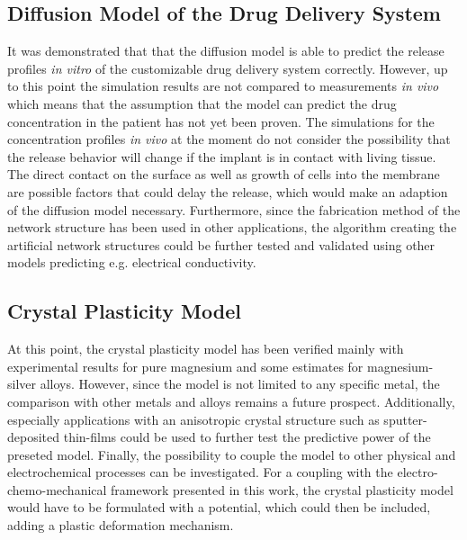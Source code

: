 \subsection*{Diffusion Model of the Drug Delivery System}
It was demonstrated that that the diffusion model is able to predict the release profiles \textit{in vitro} of the customizable drug delivery system correctly. However, up to this point the simulation results are not compared to measurements \textit{in vivo} which means that the assumption that the model can predict the drug concentration in the patient has not yet been proven. The simulations for the concentration profiles \textit{in vivo} at the moment do not consider the possibility that the release behavior will change if the implant is in contact with living tissue. The direct contact on the surface as well as growth of cells into the membrane are possible factors that could delay the release, which would make an adaption of the diffusion model necessary. Furthermore, since the fabrication method of the network structure has been used in other applications\supercite{schutt_electrically_2021,reimers_multifunctional_2023}, the algorithm creating the artificial network structures could be further tested and validated using other models predicting e.g. electrical conductivity. 

\subsection*{Crystal Plasticity Model}
At this point, the crystal plasticity model has been verified mainly with experimental results for pure magnesium and some estimates for magnesium-silver alloys. However, since the model is not limited to any specific metal, the comparison with other metals and alloys remains a future prospect. Additionally, especially applications with an anisotropic crystal structure such as sputter-deposited thin-films could be used to further test the predictive power of the preseted model. Finally, the possibility to couple the model to other physical and electrochemical processes can be investigated. For a coupling with the electro-chemo-mechanical framework presented in this work, the crystal plasticity model would have to be formulated with a potential, which could then be included, adding a plastic deformation mechanism.  


